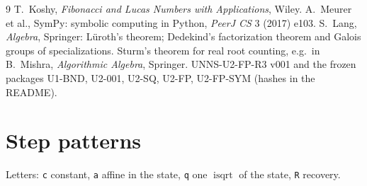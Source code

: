 \documentclass[11pt]{article}
\theoremstyle{definition}
\theoremstyle{remark}
\DeclareMathOperator{\isqrt}{isqrt}
\begin{document}
\begin{thebibliography}{9}\small
{} T.~Koshy, \emph{Fibonacci and Lucas Numbers with Applications}, Wiley.
 A.~Meurer et al., SymPy: symbolic computing in Python, \emph{PeerJ CS} 3 (2017) e103.
 S.~Lang, \emph{Algebra}, Springer: Lüroth's theorem; Dedekind's factorization theorem and Galois groups of specializations.
 Sturm's theorem for real root counting, e.g.\ in B.~Mishra, \emph{Algorithmic Algebra}, Springer.
 UNNS-U2-FP-R3 v001 and the frozen packages U1-BND, U2-001, U2-SQ, U2-FP, U2-FP-SYM (hashes in the README).
\end{thebibliography}

\appendix
\section{Step patterns}

Letters: \texttt{c} constant, \texttt{a} affine in the state, \texttt{q} one $\isqrt$ of the state, \texttt{R} recovery.
\end{document}
